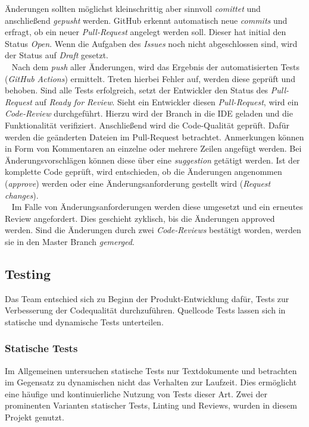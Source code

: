 \documentclass[10pt, a4paper]{article}
\begin{document}
\begin{onehalfspace}
    Änderungen sollten möglichst kleinschrittig aber sinnvoll \textit{comittet} und anschließend \textit{gepusht} werden.
    GitHub erkennt automatisch neue \textit{commits} und erfragt, ob ein neuer \textit{Pull-Request} angelegt werden soll.
    Dieser hat initial den Status \textit{Open}.
    Wenn die Aufgaben des \textit{Issues} noch nicht abgeschlossen sind, wird der Status auf \textit{Draft} gesetzt.
    \\~
    Nach dem \textit{push} aller Änderungen, wird das Ergebnis der automatisierten Tests (\textit{GitHub Actions}) ermittelt. Treten hierbei Fehler auf,
    werden diese geprüft und behoben. Sind alle Tests erfolgreich, setzt der Entwickler den Status des \textit{Pull-Request} auf \textit{Ready for Review}.
    Sieht ein Entwickler diesen \textit{Pull-Request}, wird ein \textit{Code-Review} durchgeführt.
    Hierzu wird der Branch in die IDE geladen und die Funktionalität verifiziert. Anschließend wird die Code-Qualität geprüft.
    Dafür werden die geänderten Dateien im Pull-Request betrachtet. Anmerkungen können in Form
    von Kommentaren an einzelne oder mehrere Zeilen angefügt werden. Bei Änderungsvorschlägen können diese über eine \textit{suggestion}
    getätigt werden. Ist der komplette Code geprüft, wird entschieden,
    ob die Änderungen angenommen (\textit{approve}) werden oder eine Änderungsanforderung gestellt wird (\textit{Request changes}).
    \\~
    Im Falle von Änderungsanforderungen werden diese umgesetzt und ein erneutes Review angefordert. Dies geschieht zyklisch, bis die Änderungen approved werden.
    Sind die Änderungen durch zwei \textit{Code-Reviews} bestätigt worden, werden sie in den Master Branch \textit{gemerged}.

  \subsection{Testing}
  Das Team entschied sich zu Beginn der Produkt-Entwicklung dafür, Tests zur Verbesserung der Codequalität durchzuführen.
  Quellcode Tests lassen sich in statische und dynamische Tests unterteilen.

  \subsubsection*{Statische Tests}
    Im Allgemeinen untersuchen statische Tests nur Textdokumente und betrachten im Gegensatz zu dynamischen nicht das Verhalten zur Laufzeit.
    Dies ermöglicht eine häufige und kontinuierliche Nutzung von Tests dieser Art.
    Zwei der prominenten Varianten statischer Tests, Linting und Reviews, wurden in diesem Projekt genutzt.


\end{onehalfspace}
\end{document}
